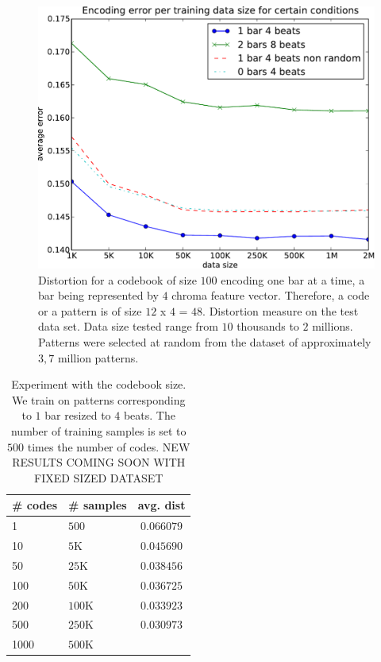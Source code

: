 \documentclass{article}
\begin{document}
\begin{figure}[htb]
\begin{center}
\includegraphics[width=.99\columnwidth]{data_sizes}
\end{center}
\caption{\small{Distortion for a codebook of size $100$ encoding one bar
at a time, a bar being represented by $4$ chroma feature vector.
Therefore, a code or a pattern is of size $12$ x $4$ = $48$.
Distortion measure on the test data set. Data size tested range
from $10$ thousands to $2$ millions. Patterns were selected at
random from the dataset of approximately $3,7$ million patterns.}}
\label{fig:data_sizes}
\end{figure}

\begin{table}
\begin{center}
\begin{tabular}{|l|l|c|}
\hline
\# codes & \# samples & avg. dist \\ \hline \hline
1 & $500$ & $0.066079$ \\
10 & $5$K & $0.045690$ \\
50 & $25$K & $0.038456$ \\
100 & $50$K & $0.036725$ \\
200 & $100$K & $0.033923$ \\
500 & $250$K & $0.030973$ \\
1000 & $500$K & \\ \hline
\end{tabular}
\end{center}
\caption{\small{Experiment with the codebook size. We train on patterns
corresponding to $1$ bar resized to $4$ beats. The number of training
samples is set to $500$ times the number of codes. 
NEW RESULTS COMING SOON WITH FIXED SIZED DATASET }}
\label{tab:cbsize}
\end{table}
\end{document}
